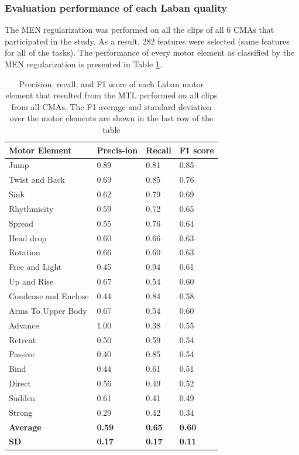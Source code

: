 \subsubsection{Evaluation performance of each Laban quality}
The MEN regularization was performed on all the clips of all 6 CMAs that
participated in the study.  As a result, 282 features were selected (same
features for all of the tasks). The performance of every motor element as
classified by the MEN regularization is presented in Table \ref{mixedSummary}.
\begin{table}[!h]


\caption{Precision, recall, and F1 score of each Laban motor element that resulted from the MTL performed on all clips from all CMAs. The F1 average and standard deviation over the motor elements are shown in the last row of the table}
\label{mixedSummary}
\centering
\begin{tabular}{|p{3cm}|p{0.9cm}|p{0.9cm}|p{0.9cm}|}
\hline
Motor Element&Precis-ion&Recall&F1 score\\\hline
Jump&0.89&0.81&0.85\\\hline
Twist and Back&0.69&0.85&0.76\\\hline
Sink&0.62&0.79&0.69\\\hline
Rhythmicity&0.59&0.72&0.65\\\hline
Spread&0.55&0.76&0.64\\\hline
Head drop&0.60&0.66&0.63\\\hline
Rotation&0.66&0.60&0.63\\\hline
Free and Light&0.45&0.94&0.61\\\hline
Up and Rise&0.67&0.54&0.60\\\hline
Condense and Enclose&0.44&0.84&0.58\\\hline
Arms To Upper Body&0.67&0.54&0.60\\\hline
Advance&1.00&0.38&0.55\\\hline
Retreat&0.50&0.59&0.54\\\hline
Passive&0.40&0.85&0.54\\\hline
Bind&0.44&0.61&0.51\\\hline
Direct&0.56&0.49&0.52\\\hline
Sudden&0.61&0.41&0.49\\\hline
Strong&0.29&0.42&0.34\\\hline
\textbf{Average}&\textbf{0.59}&\textbf{0.65}&\textbf{0.60}\\\hline
\textbf{SD}&\textbf{0.17}&\textbf{0.17}&\textbf{0.11}\\\hline
\end{tabular}

\end{table}
